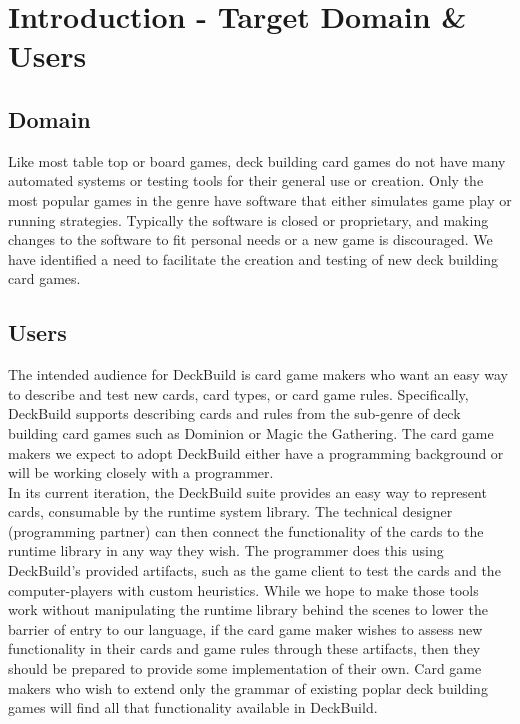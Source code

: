 

\section{Introduction - Target Domain \& Users} \label{sec:intro}
\subsection{Domain}
Like most table top or board games, deck building card games do not have many automated systems or
testing tools for their general use or creation. Only the most popular games in the genre have software that
either simulates game play or running strategies. Typically the software is closed or proprietary, and
making changes to the software to fit personal needs or a new game is discouraged. We have identified a need
to facilitate the creation and testing of new deck building card games.
\subsection{Users}
The intended audience for DeckBuild is card game makers who want
an easy way to describe and test new cards, card types, or card game rules. Specifically, DeckBuild
supports describing cards and rules from the sub-genre of deck building card games such as Dominion or Magic the
Gathering. The card game makers we expect to adopt DeckBuild either have a programming
background or will be working closely with a programmer.
\\
In its current iteration, the DeckBuild
suite provides an easy way to represent cards, consumable by the runtime system library.
The technical designer (programming partner) can then connect the functionality of the cards to
the runtime library in any way they wish. The programmer does this using DeckBuild's provided
artifacts, such as the game client to test the cards and the computer-players with custom heuristics.
While we hope to make those tools work without manipulating the
runtime library behind the scenes to lower the barrier of entry to our language, if the card game maker
wishes to assess new functionality in their cards and game rules through these artifacts, then
they should be prepared to provide some implementation of their own. Card game makers who wish to
extend only the grammar of existing poplar deck building games will find all that functionality
available in DeckBuild.

